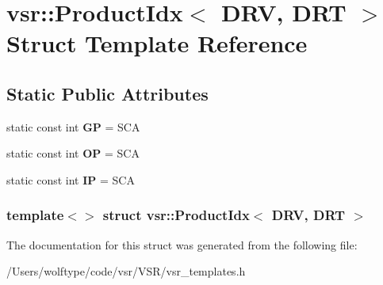\hypertarget{structvsr_1_1_product_idx_3_01_d_r_v_00_01_d_r_t_01_4}{\section{vsr\-:\-:Product\-Idx$<$ D\-R\-V, D\-R\-T $>$ Struct Template Reference}
\label{structvsr_1_1_product_idx_3_01_d_r_v_00_01_d_r_t_01_4}
}
\subsection*{Static Public Attributes}
\begin{DoxyCompactItemize}
\item 
\hypertarget{structvsr_1_1_product_idx_3_01_d_r_v_00_01_d_r_t_01_4_a11f2ed238323515b2f455d86318de809}{static const int {\bfseries G\-P} = S\-C\-A}\label{structvsr_1_1_product_idx_3_01_d_r_v_00_01_d_r_t_01_4_a11f2ed238323515b2f455d86318de809}

\item 
\hypertarget{structvsr_1_1_product_idx_3_01_d_r_v_00_01_d_r_t_01_4_aabf40bba929d09ea70d22a8d8818f257}{static const int {\bfseries O\-P} = S\-C\-A}\label{structvsr_1_1_product_idx_3_01_d_r_v_00_01_d_r_t_01_4_aabf40bba929d09ea70d22a8d8818f257}

\item 
\hypertarget{structvsr_1_1_product_idx_3_01_d_r_v_00_01_d_r_t_01_4_a435eea6852942f1bf8ed74a42e462891}{static const int {\bfseries I\-P} = S\-C\-A}\label{structvsr_1_1_product_idx_3_01_d_r_v_00_01_d_r_t_01_4_a435eea6852942f1bf8ed74a42e462891}

\end{DoxyCompactItemize}
\subsubsection*{template$<$$>$ struct vsr\-::\-Product\-Idx$<$ D\-R\-V, D\-R\-T $>$}



The documentation for this struct was generated from the following file\-:\begin{DoxyCompactItemize}
\item 
/\-Users/wolftype/code/vsr/\-V\-S\-R/vsr\-\_\-templates.\-h\end{DoxyCompactItemize}
